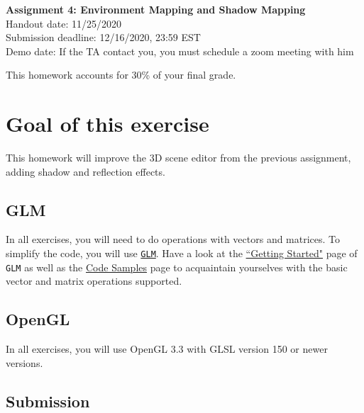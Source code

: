 \documentclass[11pt]{article}
\begin{document}
\hspace{50pt}

\begin{center}

{\Huge \textbf{Assignment 4: Environment Mapping and Shadow Mapping}}\\
\vspace{10pt}
Handout date: 11/25/2020\\
Submission deadline: 12/16/2020,  23:59 EST\\
Demo date: If the TA contact you, you must schedule a zoom meeting with him
\end{center}

\noindent This homework accounts for 30\% of your final grade. 

\section*{Goal of this exercise}
This homework will improve the 3D scene editor from the previous assignment, adding shadow and reflection effects.

\subsection*{GLM}
In all exercises, you will need to do operations with vectors and matrices. To simplify the code, you will use \href{https://glm.g-truc.net/0.9.9/index.html}{\texttt{GLM}}. 
Have a look at the \href{https://github.com/g-truc/glm/blob/master/manual.md#section1}{``Getting Started"} page of \texttt{GLM} as well as the \href{https://github.com/g-truc/glm/blob/master/manual.md#section8}{Code Samples} page to acquaintain yourselves with the basic vector and matrix operations supported. 

\subsection*{OpenGL}
In all exercises, you will use OpenGL 3.3 with GLSL version 150 or newer versions.

\subsection*{Submission}

\end{document}
